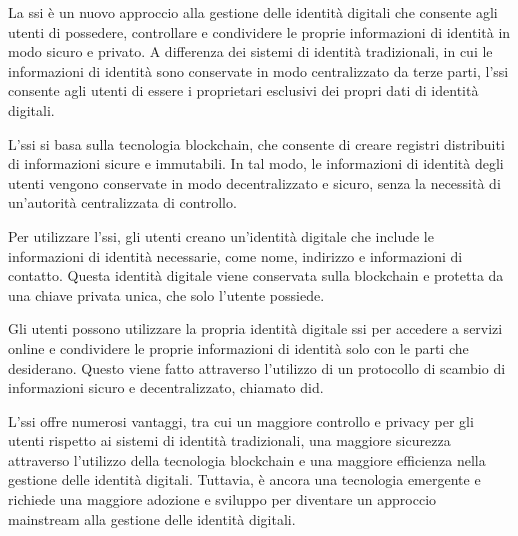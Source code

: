 La \acrfull{ssi}\cite{site:ssi} è un nuovo approccio alla gestione delle identità digitali che consente agli utenti di possedere, controllare e condividere le proprie informazioni di identità in modo sicuro e privato. A differenza dei sistemi di identità tradizionali, in cui le informazioni di identità sono conservate in modo centralizzato da terze parti, l'\acrshort{ssi} consente agli utenti di essere i proprietari esclusivi dei propri dati di identità digitali.

L'\acrshort{ssi} si basa sulla tecnologia blockchain, che consente di creare registri distribuiti di informazioni sicure e immutabili. In tal modo, le informazioni di identità degli utenti vengono conservate in modo decentralizzato e sicuro, senza la necessità di un'autorità centralizzata di controllo.

Per utilizzare l'\acrshort{ssi}, gli utenti creano un'identità digitale che include le informazioni di identità necessarie, come nome, indirizzo e informazioni di contatto. Questa identità digitale viene conservata sulla blockchain e protetta da una chiave privata unica, che solo l'utente possiede.

Gli utenti possono utilizzare la propria identità digitale \acrshort{ssi} per accedere a servizi online e condividere le proprie informazioni di identità solo con le parti che desiderano. Questo viene fatto attraverso l'utilizzo di un protocollo di scambio di informazioni sicuro e decentralizzato, chiamato \acrfull{did}.

L'\acrshort{ssi} offre numerosi vantaggi, tra cui un maggiore controllo e privacy per gli utenti rispetto ai sistemi di identità tradizionali, una maggiore sicurezza attraverso l'utilizzo della tecnologia blockchain e una maggiore efficienza nella gestione delle identità digitali. Tuttavia, è ancora una tecnologia emergente e richiede una maggiore adozione e sviluppo per diventare un approccio mainstream alla gestione delle identità digitali.
